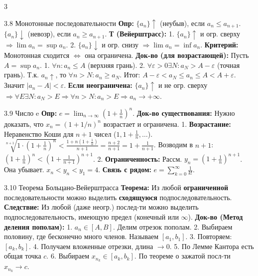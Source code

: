 \documentclass[8pt, a4paper, landscape]{extarticle}
\newcommand{\Ra}{\Rightarrow}
\newcommand{\eps}{\varepsilon}
\begin{document}
\begin{multicols*}{3}
\begin{ticket}{3.8 Монотонные последовательности}
\textbf{Опр:} $\{a_n\} \uparrow$ (неубыв), если $a_n \le a_{n+1}$.
$\{a_n\} \downarrow$ (невозр), если $a_n \ge a_{n+1}$.
\textbf{Т (Вейерштрасс):}
1. $\{a_n\} \uparrow$ и огр. сверху $\Ra \lim a_n = \sup a_n$.
2. $\{a_n\} \downarrow$ и огр. снизу $\Ra \lim a_n = \inf a_n$.
\textbf{Критерий:} Монотонная сходится $\iff$ она ограничена.
\tcblower
\textbf{Док-во (для возрастающей):}
Пусть $A = \sup a_n$.
1. $\forall n: a_n \le A$ (верхняя грань).
2. $\forall \eps>0 \exists N: a_N > A-\eps$ (точная грань).
Т.к. $a_n \uparrow$, то $\forall n>N: a_n \ge a_N$.
Итог: $A-\eps < a_N \le a_n \le A < A+\eps$.
Значит $|a_n - A| < \eps$.
\textbf{Если неограничена:}
$\{a_n\} \uparrow$ и не огр. сверху $\Ra \forall E \exists N: a_N > E \Ra \forall n>N: a_n > E \Ra a_n \to +\infty$.
\end{ticket}

\begin{ticket}{3.9 Число e}
\textbf{Опр:} $e = \lim_{n\to\infty} (1+\frac{1}{n})^n$.
\textbf{Док-во существования:}
Нужно доказать, что $x_n = (1+1/n)^n$ возрастает и ограничена.
1. \textbf{Возрастание:} Неравенство Коши для $n+1$ чисел ($1, 1+\frac{1}{n}, \dots$).
$\sqrt[n+1]{1 \cdot (1+\frac{1}{n})^n} < \frac{1 + n(1+\frac{1}{n})}{n+1} = \frac{n+2}{n+1} = 1+\frac{1}{n+1}$.
Возводим в $n+1$: $(1+\frac{1}{n})^n < (1+\frac{1}{n+1})^{n+1}$.
2. \textbf{Ограниченность:} Рассм. $y_n = (1+\frac{1}{n})^{n+1}$. Она убывает.
$x_n < y_n < y_1 = 4$.
\textbf{Связь с рядом:} $e = \sum_{k=0}^\infty \frac{1}{k!}$.
\end{ticket}

\begin{ticket}{3.10 Теорема Больцано-Вейерштрасса}
\textbf{Теорема:} Из любой \textbf{ограниченной} последовательности можно выделить \textbf{сходящуюся} подпоследовательность.
\textbf{Следствие:} Из любой (даже неогр.) послед-ти можно выделить подпоследовательность, имеющую предел (конечный или $\infty$).
\tcblower
\textbf{Док-во (Метод деления пополам):}
1. $a_n \in [A, B]$. Делим отрезок пополам.
2. Выбираем половину, где бесконечно много членов. Называем $[a_1, b_1]$.
3. Повторяем: $[a_k, b_k]$.
4. Получаем вложенные отрезки, длина $\to 0$.
5. По Лемме Кантора есть общая точка $c$.
6. Выбираем $x_{n_k} \in [a_k, b_k]$. По теореме о зажатой посл-ти $x_{n_k} \to c$.
\end{ticket}


\end{multicols*}
\end{document}
